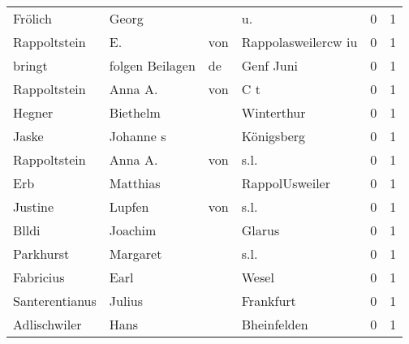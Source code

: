 \begin{center}
\begin{tiny}
\begin{longtabu}{llllrr}
                  Frölich &                              Georg &             &                                         u.  &          0 &         1 \\
             Rappoltstein &                                 E. &         von &                         Rappolasweilercw iu &          0 &         1 \\
                   bringt &                    folgen Beilagen &          de &                                   Genf Juni &          0 &         1 \\
             Rappoltstein &                            Anna A. &         von &                                         C t &          0 &         1 \\
                   Hegner &                           Biethelm &             &                                  Winterthur &          0 &         1 \\
                    Jaske &                          Johanne s &             &                                  Königsberg &          0 &         1 \\
             Rappoltstein &                            Anna A. &         von &                                        s.l. &          0 &         1 \\
                      Erb &                           Matthias &             &                              RappolUsweiler &          0 &         1 \\
                  Justine &                             Lupfen &         von &                                        s.l. &          0 &         1 \\
                    Blldi &                            Joachim &             &                                      Glarus &          0 &         1 \\
                Parkhurst &                           Margaret &             &                                        s.l. &          0 &         1 \\
                Fabricius &                               Earl &             &                                       Wesel &          0 &         1 \\
           Santerentianus &                             Julius &             &                                   Frankfurt &          0 &         1 \\
             Adlischwiler &                               Hans &             &                                 Bheinfelden &          0 &         1 \\

\end{longtabu}
\end{tiny}
\end{center}
